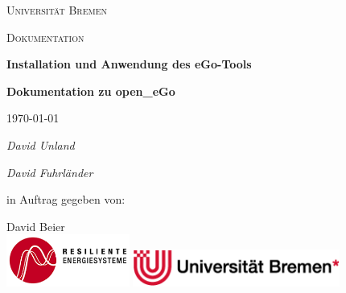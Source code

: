 \documentclass[
a4paper,     %
12pt         %
]{scrartcl}  %
\begin{document}
\begin{titlepage}
	\centering
	{\scshape\Large Universität Bremen \par}
	\vspace{0.8cm}
	{\scshape\LARGE Dokumentation \par}
	\vspace{1.7cm}
	{\huge\bfseries {Installation und Anwendung des eGo-Tools}\par}
	\vspace{1cm}
	{ \bfseries{Dokumentation zu open\_eGo}\par}
	\vspace{2cm}
	{\large \today\par}
	\vspace{2cm}
	
	{\Large\itshape David Unland \par}
	{\Large\itshape David Fuhrländer \par}
	
	\vfill
	in Auftrag gegeben von:\par
	
	David Beier\\
	\vfill
	\includegraphics[height = 17mm]{Abb/RES_EN_logo_de_rot_mittel.png}%
	\hfill
	\includegraphics[height = 12mm]{Abb/Logo_uni_Bild1.png}
	
	
	
\end{titlepage}



\newpage
\end{document}
